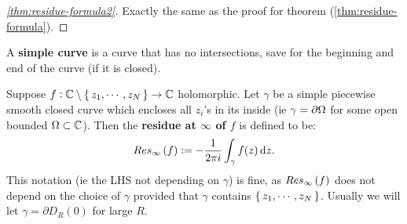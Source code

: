 \begin{proof}[\ref{thm:residue-formula2}]
Exactly the same as the proof for theorem (\ref{thm:residue-formula}).
\end{proof}

\begin{definition}
A \textbf{simple curve} is a curve that has no intersections, save for the beginning and end of the curve (if it is closed).
\end{definition}



\begin{definition}
Suppose $f:\mathbb{C} \setminus \set{z_1, \cdots ,z_N} \to \mathbb{C}$ holomorphic. Let $\gamma$ be a simple piecewise smooth closed curve which encloses all $z_i$'s in its inside (ie $\gamma = \partial \Omega$ for some open bounded $\Omega \subset \mathbb{C}$). Then the \textbf{residue at $\infty$ of $f$} is defined to be:
\begin{align*}
    \res{\infty}{f} \vcentcolon = - \frac{1}{2 \pi i} \int_\gamma f(z) \dif z.
\end{align*}
This notation (ie the LHS not depending on $\gamma$) is fine, as $Res_{\infty} \left( f \right)$ does not depend on the choice of $\gamma$ provided that $\gamma$ contains $\set{z_1, \cdots ,z_N}$. Usually we will let $\gamma  = \partial D_R(0)$ for large $R$.

\end{definition}



